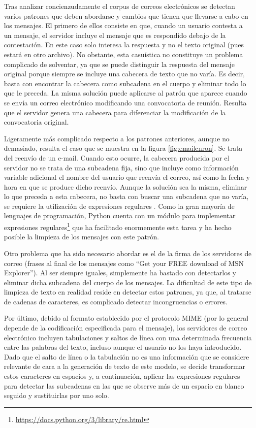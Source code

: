 Tras analizar concienzudamente el corpus de correos electrónicos se detectan varios patrones que deben abordarse y cambios que tienen que llevarse a cabo en los mensajes. El primero de ellos consiste en que, cuando un usuario contesta a un mensaje, el servidor incluye el mensaje que es respondido debajo de la contestación. En este caso solo interesa la respuesta y no el texto original (pues estará en otro archivo). No obstante, esta casuística no constituye un problema complicado de solventar, ya que se puede distinguir la respuesta del mensaje original porque siempre se incluye una cabecera de texto que no varía. Es decir, basta con encontrar la cabecera como subcadena en el cuerpo y eliminar todo lo que le preceda. La misma solución puede aplicarse al patrón que aparece cuando se envía un correo electrónico modificando una convocatoria de reunión. Resulta que el servidor genera una cabecera para diferenciar la modificación de la convocatoria original.

Ligeramente más complicado respecto a los patrones anteriores, aunque no demasiado, resulta el caso que se muestra en la figura \ref{fig:emailenron}. Se trata del reenvío de un e-mail. Cuando esto ocurre, la cabecera producida por el servidor no se trata de una subcadena fija, sino que incluye como información variable adicional el nombre del usuario que reenvía el correo, así como la fecha y hora en que se produce dicho reenvío. Aunque la solución sea la misma, eliminar lo que preceda a esta cabecera, no basta con buscar una subcadena que no varía, se requiere la utilización de expresiones regulares \citep{thompson1968programming}. Como la gran mayoría de lenguajes de programación, Python cuenta con un módulo para implementar expresiones regulares\footnote{\url{https://docs.python.org/3/library/re.html}} que ha facilitado enormemente esta tarea y ha hecho posible la limpieza de los mensajes con este patrón.

Otro problema que ha sido necesario abordar es el de la firma de los servidores de correo (frases al final de los mensajes como ``Get your FREE download of MSN Explorer''). Al ser siempre iguales, simplemente ha bastado con detectarlos y eliminar dicha subcadena del cuerpo de los mensajes. La dificultad de este tipo de limpieza de texto en realidad reside en detectar estos patrones, ya que, al tratarse de cadenas de caracteres, es complicado detectar incongruencias o errores.

Por último, debido al formato establecido por el protocolo MIME (por lo general depende de la codificación especificada para el mensaje), los servidores de correo electrónico incluyen tabulaciones y saltos de línea con una determinada frecuencia entre las palabras del texto, incluso aunque el usuario no los haya introducido. Dado que el salto de línea o la tabulación no es una información que se considere relevante de cara a la generación de texto de este modelo, se decide transformar estos caracteres en espacios y, a continuación, aplicar las expresiones regulares para detectar las subcadenas en las que se observe más de un espacio en blanco seguido y sustituirlas por uno solo.


